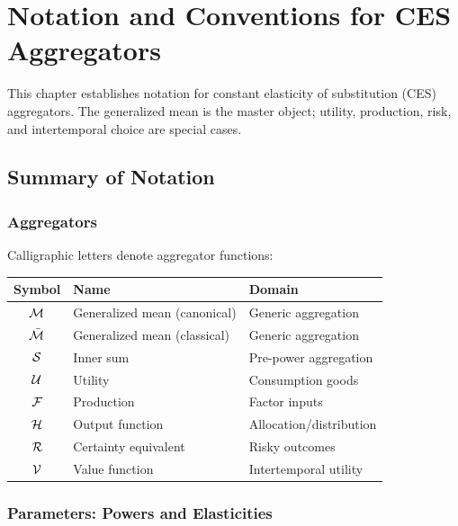 \chapter*{Notation and Conventions for CES Aggregators}

\begin{calloutnote}[Purpose]
This chapter establishes notation for constant elasticity of substitution (CES) aggregators. The generalized mean is the master object; utility, production, risk, and intertemporal choice are special cases.
\end{calloutnote}

\section*{Summary of Notation}

\subsection*{Aggregators}

Calligraphic letters denote aggregator functions:

\begin{center}
\begin{tabular}{@{}cll@{}}
\toprule
Symbol & Name & Domain \\
\midrule
$\mathcal{M}$ & Generalized mean (canonical) & Generic aggregation \\
$\bar{\mathcal{M}}$ & Generalized mean (classical) & Generic aggregation \\
$\mathcal{S}$ & Inner sum & Pre-power aggregation \\
$\mathcal{U}$ & Utility & Consumption goods \\
$\mathcal{F}$ & Production & Factor inputs \\
$\mathcal{H}$ & Output function & Allocation/distribution \\
$\mathcal{R}$ & Certainty equivalent & Risky outcomes \\
$\mathcal{V}$ & Value function & Intertemporal utility \\
\bottomrule
\end{tabular}
\end{center}

\subsection*{Parameters: Powers and Elasticities}

